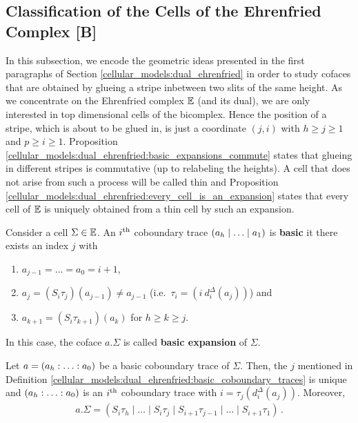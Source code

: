 \subsection{Classification of the Cells of the Ehrenfried Complex [B]}
\label{cellular_models:dual_ehrenfried:classification_of_the_cells}
In this subsection, we encode the geometric ideas presented in the first paragraphs of Section \ref{cellular_models:dual_ehrenfried}
in order to study cofaces that are obtained by glueing a stripe inbetween two slits of the same height.
As we concentrate on the Ehrenfried complex $\mathbb E$ (and its dual), we are only interested in top dimensional cells of the bicomplex.
Hence the position of a stripe, which is about to be glued in, is just a coordinate $(j,i)$ with $h \ge j \ge 1$ and $p \ge i \ge 1$.
Proposition \ref{cellular_models:dual_ehrenfried:basic_expansions_commute} states that glueing in different stripes is commutative (up to relabeling the heights).
A cell that does not arise from such a process will be called thin and Proposition \ref{cellular_models:dual_ehrenfried:every_cell_is_an_expansion}
states that every cell of $\mathbb E$ is uniquely obtained from a thin cell by such an expansion.

\begin{defi}
    \label{cellular_models:dual_ehrenfried:basic_coboundary_traces}
    Consider a cell $\Sigma \in \mathbb E$.
    An $i^{\text{th}}$ coboundary trace $\inhom[a]$ is {\bf basic} it there exists an index $j$ with
    \begin{enumerate}
        \item $a_{j-1} = \ldots = a_0 = i+1$,
        \item $a_j = (S_i\tau_j)(a_{j-1}) \neq a_{j-1}$ (i.e.\ $\tau_i = (i\ d^\Delta_i(a_j))$) and
        \item $a_{k+1} = (S_i\tau_{k+1})(a_k)$ for $h \ge k \ge j$.
    \end{enumerate}
    In this case, the coface $a.\Sigma$ is called {\bf basic expansion} of $\Sigma$.
\end{defi}

\begin{lem}
    \label{cellular_models:dual_ehrenfried:basic_coboundary_traces_have_unique_j_and_i}
    Let $a = \homog[a]$ be a basic coboundary trace of $\Sigma$.
    Then, the $j$ mentioned in Definition \ref{cellular_models:dual_ehrenfried:basic_coboundary_traces} is unique and
    $\homog[a]$ is an $i^{\text{th}}$ coboundary trace with $i = \tau_j( d_i^\Delta(a_j) )$.
    Moreover,
    \begin{align}
        \label{cellular_models:dual_ehrenfried:basic_coboundary_trace_applied_to_cell}
        a.\Sigma = (S_i\tau_h \mid \ldots \mid S_i\tau_j \mid S_{i+1}\tau_{j-1} \mid \ldots \mid S_{i+1}\tau_1) \,.
    \end{align}

\end{lem}

